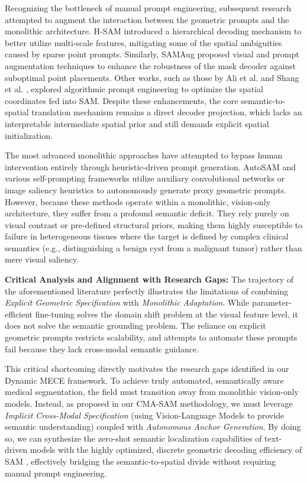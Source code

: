 \documentclass[onecolumn]{IEEEtran}
\numberwithin{equation}{section}
\theoremstyle{definition}
\theoremstyle{remark}
\begin{document}
Recognizing the bottleneck of manual prompt engineering, subsequent research attempted to augment the interaction between the geometric prompts and the monolithic architecture. H-SAM \cite{cheng2024unleashing} introduced a hierarchical decoding mechanism to better utilize multi-scale features, mitigating some of the spatial ambiguities caused by sparse point prompts. Similarly, SAMAug \cite{dai2024samaug} proposed visual and prompt augmentation techniques to enhance the robustness of the mask decoder against suboptimal point placements. Other works, such as those by Ali et al. \cite{ali2023prompt} and Shang et al. \cite{shang2024prompt}, explored algorithmic prompt engineering to optimize the spatial coordinates fed into SAM. Despite these enhancements, the core semantic-to-spatial translation mechanism remains a direct decoder projection, which lacks an interpretable intermediate spatial prior and still demands explicit spatial initialization.

The most advanced monolithic approaches have attempted to bypass human intervention entirely through heuristic-driven prompt generation. AutoSAM \cite{shaharabany2023autosam} and various self-prompting frameworks \cite{wu2023self} utilize auxiliary convolutional networks or image saliency heuristics to autonomously generate proxy geometric prompts. However, because these methods operate within a monolithic, vision-only architecture, they suffer from a profound semantic deficit. They rely purely on visual contrast or pre-defined structural priors, making them highly susceptible to failure in heterogeneous tissues where the target is defined by complex clinical semantics (e.g., distinguishing a benign cyst from a malignant tumor) rather than mere visual saliency. 

\textbf{Critical Analysis and Alignment with Research Gaps:} 
The trajectory of the aforementioned literature perfectly illustrates the limitations of combining \textit{Explicit Geometric Specification} with \textit{Monolithic Adaptation}. While parameter-efficient fine-tuning \cite{zhang2023customized, wu2025medical} solves the domain shift problem at the visual feature level, it does not solve the semantic grounding problem. The reliance on explicit geometric prompts restricts scalability, and attempts to automate these prompts \cite{shaharabany2023autosam, wu2023self} fail because they lack cross-modal semantic guidance. 

This critical shortcoming directly motivates the research gaps identified in our Dynamic MECE framework. To achieve truly automated, semantically aware medical segmentation, the field must transition away from monolithic vision-only models. Instead, as proposed in our CMA-SAM methodology, we must leverage \textit{Implicit Cross-Modal Specification} (using Vision-Language Models to provide semantic understanding) coupled with \textit{Autonomous Anchor Generation}. By doing so, we can synthesize the zero-shot semantic localization capabilities of text-driven models with the highly optimized, discrete geometric decoding efficiency of SAM \cite{kirillov2023segment}, effectively bridging the semantic-to-spatial divide without requiring manual prompt engineering.
\end{document}
